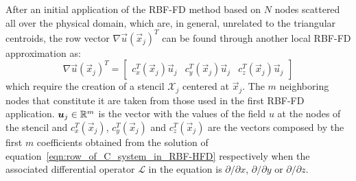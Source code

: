After an initial application of the RBF-FD method based on $N$ nodes scattered all over the physical domain, which are, in general, unrelated to the triangular centroids, the row vector $\nabla \vec{u}(\vec{x}_j)^T$ can be found through another local RBF-FD approximation as:
\begin{equation}
	\nabla \vec{u}(\vec{x}_j)^T =
	\begin{bmatrix}
		c_x^T(\vec{x}_j) \vec{u}_j  &  c_y^T(\vec{x}_j) \vec{u}_j  &  c_z^T(\vec{x}_j) \vec{u}_j
	\end{bmatrix}
\end{equation}
which require the creation of a stencil $\mathcal{X}_j$ centered at $\vec{x}_j$. The $m$ neighboring nodes that constitute it are taken from those used in the first RBF-FD application. $\boldsymbol{u}_j \in \mathbb{R}^m$ is the vector with the values of the field $u$ at the nodes of the stencil and $c_x^T(\vec{x}_j)$, $c_y^T(\vec{x}_j)$ and $c_z^T(\vec{x}_j)$ are the vectors composed by the first $m$ coefficients obtained from the solution of equation~\eqref{eqn:row_of_C_system_in_RBF-HFD} respectively when the associated differential operator $\mathcal{L}$ in the equation is $\partial / \partial x$, $\partial / \partial y$ or $\partial / \partial z$.

